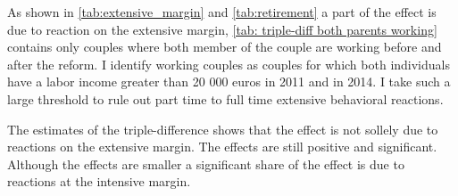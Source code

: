 \begin{subappendices}
As shown in \autoref{tab:extensive_margin} and \autoref{tab:retirement} a part of the effect is due to reaction on the extensive margin, \autoref{tab: triple-diff both parents working} contains only couples where both member of the couple are working before and after the reform. I identify working couples as couples for which both individuals have a labor income greater than 20 000 euros in 2011 and in 2014. I take such a large threshold to rule out part time to full time extensive behavioral reactions.


 The estimates of the triple-difference shows that the effect is not sollely due to reactions on the extensive margin. The effects are still positive and significant. Although the effects are smaller a significant share of the effect is due to reactions at the intensive margin.










\end{subappendices}
